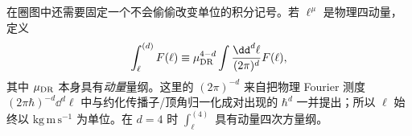 在圈图中还需要固定一个不会偷偷改变单位的积分记号。若 $\ell^\mu$ 是物理四动量，定义
\begin{equation}
 {
 \int_{\ell}^{(d)}F(\ell)
 \equiv
 \mu_{\rm DR}^{4-d}
 \int\frac{\dd^d \ell}{(2\pi)^d}F(\ell),}
 \label{eq:reduced-loop-measure-si-r10}
\end{equation}
其中 $\mu_{\rm DR}$ 本身具有\emph{动量}量纲。这里的 $(2\pi)^{-d}$ 来自把物理 Fourier 测度 $(2\pi\hbar)^{-d}\dd^d \ell$ 中与约化传播子/顶角归一化成对出现的 $\hbar^d$ 一并提出；所以 $\ell$ 始终以 $\mathrm{kg\,m\,s^{-1}}$ 为单位。在 $d=4$ 时 $\int_\ell^{(4)}$ 具有动量四次方量纲。
